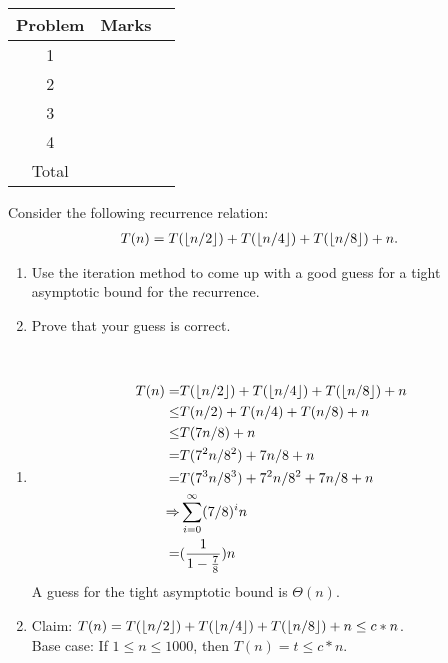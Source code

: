 \documentclass{assignment}
\DeclarePairedDelimiter\floor{\lfloor}{\rfloor}
\begin{document}
\begin{center}
\renewcommand{\arraystretch}{2}
\begin{tabular}{|c|c|c|} \hline
Problem & Marks \\ \hline \hline
1 & \\ \hline
2 & \\ \hline
3 & \\ \hline
4 & \\ \hline \hline
Total & \\ \hline
\end{tabular}
\end{center}

\bigskip

\begin{problemlist}

\clearpage
\pbitem
\begin{problem}
Consider the following recurrence relation:
\begin{align*}
T(n)=T(\floor{n/2})+T(\floor{n/4})+T(\floor{n/8})+n.
\end{align*}
\begin{enumerate}
\item Use the iteration method to come up with a good guess for a tight asymptotic bound for the recurrence.
\item Prove that your guess is correct.
\end{enumerate}
\end{problem}
\begin{answer}
\\
\begin{enumerate}
\item
\begin{align*}
T(n)=&T(\floor{n/2}) + T(\floor{n/4}) + T(\floor{n/8}) + n\\
\le&T(n/2) + T(n/4) + T(n/8) + n\\
\le&T(7n/8) + n\\
=&T(7^2n/8^2) + 7n/8 + n\\
=&T(7^3n/8^3) + 7^2n/8^2 + 7n/8 + n\\
\Rightarrow&\sum_{i=0}^\infty (7/8)^in\\
=&(\frac{1}{1-\frac{7}{8}})n\\
\end{align*}
A guess for the tight asymptotic bound is $\Theta (n)$.\\
\item
Claim: $T(n)=T(\floor{n/2})+T(\floor{n/4})+T(\floor{n/8})+n \le c*n$.\\
Base case: If $1 \le n \le 1000$, then $T(n) = t \le c*n$.\\

\end{enumerate}
\end{answer}
\end{problemlist}
\end{document}

